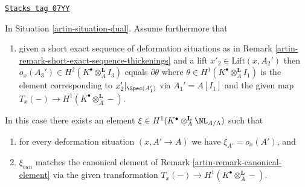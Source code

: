 \begin{lemma}
\label{artin-lemma-dual-obstruction}
\href{https://stacks.math.columbia.edu/tag/07YY}{\texttt{Stacks tag 07YY}}

In Situation \ref{artin-situation-dual}. Assume furthermore that
\begin{enumerate}
\item[(iv)] given a short exact sequence of deformation situations
as in Remark \ref{artin-remark-short-exact-sequence-thickenings} and
a lift $x'_2 \in \text{Lift}(x, A_2')$ then
$o_x(A_3') \in H^2(K^\bullet \otimes_A^\mathbf{L} I_3)$
equals $\partial\theta$ where
$\theta \in H^1(K^\bullet \otimes_A^\mathbf{L} I_1)$
is the element corresponding to $x'_2|_{\Spec(A_1')}$ via
$A_1' = A[I_1]$ and the given map
$T_x(-) \to H^1(K^\bullet \otimes_A^\mathbf{L} -)$.
\end{enumerate}
In this case there exists an element
$\xi \in H^1(K^\bullet \otimes_A^\mathbf{L} \NL_{A/\Lambda})$
such that
\begin{enumerate}
\item for every deformation situation $(x, A' \to A)$ we have
$\xi_{A'} = o_x(A')$, and
\item $\xi_{can}$ matches the canonical element of
Remark \ref{artin-remark-canonical-element} via the given transformation
$T_x(-) \to H^1(K^\bullet \otimes_A^\mathbf{L} -)$.
\end{enumerate}
\end{lemma}

